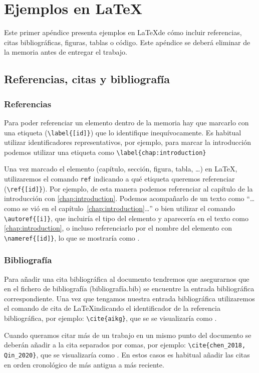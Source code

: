 \chapter{Ejemplos en \LaTeX}

Este primer apéndice presenta ejemplos en \LaTeX de cómo incluir referencias, citas bibliográficas, figuras, tablas o código. Este apéndice se deberá eliminar de la memoria antes de entregar el trabajo. 
 
\section{Referencias, citas y bibliografía}
\subsection{Referencias}
Para poder referenciar un elemento dentro de la memoria hay que marcarlo con una etiqueta (\verb|\label{[id]}|) que lo identifique inequívocamente. Es habitual utilizar identificadores  representativos, por ejemplo, para marcar la introducción podemos utilizar una etiqueta como \verb|\label{chap:introduction}|

Una vez marcado el elemento (capítulo, sección, figura, tabla, \ldots) en \LaTeX, utilizaremos el comando \verb|ref| indicando a qué etiqueta queremos referenciar (\verb|\ref{[id]}|). Por ejemplo, de esta manera podemos referenciar al capítulo de la introducción con \ref{chap:introduction}. Podemos acompañarlo de un texto como ``\ldots como se vió en el capítulo~\ref{chap:introduction}\ldots'' o bien utilizar el comando \verb|\autoref{[i]}|, que incluiría el tipo del elemento y aparecería en el texto como \autoref{chap:introduction}, o incluso referenciarlo por el nombre del elemento con \verb|\nameref{[id]}|, lo que se mostraría como . 

\subsection{Bibliografía}
Para añadir una cita bibliográfica al documento tendremos que asegurarnos que en el fichero de bibliografía (bibliografía.bib) se encuentre la entrada bibliográfica correspondiente. Una vez que tengamos nuestra entrada bibliográfica utilizaremos el comando de cita de \LaTeX indicando el identificador de la referencia bibliográfica, por ejemplo: 
\verb|\cite{aikg}|, que se se visualizaría como \cite{aikg}. 

Cuando queramos citar más de un trabajo en un mismo punto del documento se deberán añadir a la cita separados por comas, por ejemplo: \verb|\cite{chen_2018, Qin_2020}|, que se visualizaría como \cite{chen_2018, Qin_2020}. En estos casos es habitual añadir las citas en orden cronológico de más antigua a más reciente.


